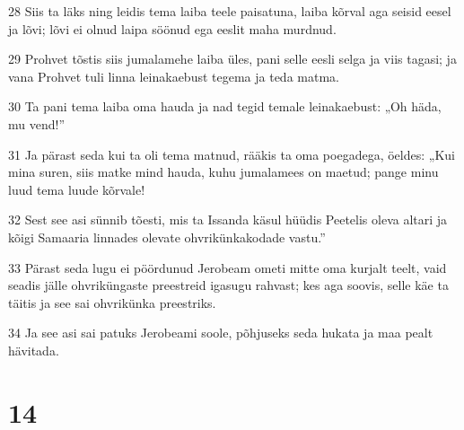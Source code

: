 \par 28 Siis ta läks ning leidis tema laiba teele paisatuna, laiba kõrval aga seisid eesel ja lõvi; lõvi ei olnud laipa söönud ega eeslit maha murdnud.
\par 29 Prohvet tõstis siis jumalamehe laiba üles, pani selle eesli selga ja viis tagasi; ja vana Prohvet tuli linna leinakaebust tegema ja teda matma.
\par 30 Ta pani tema laiba oma hauda ja nad tegid temale leinakaebust: „Oh häda, mu vend!”
\par 31 Ja pärast seda kui ta oli tema matnud, rääkis ta oma poegadega, öeldes: „Kui mina suren, siis matke mind hauda, kuhu jumalamees on maetud; pange minu luud tema luude kõrvale!
\par 32 Sest see asi sünnib tõesti, mis ta Issanda käsul hüüdis Peetelis oleva altari ja kõigi Samaaria linnades olevate ohvrikünkakodade vastu.”
\par 33 Pärast seda lugu ei pöördunud Jerobeam ometi mitte oma kurjalt teelt, vaid seadis jälle ohvriküngaste preestreid igasugu rahvast; kes aga soovis, selle käe ta täitis ja see sai ohvrikünka preestriks.
\par 34 Ja see asi sai patuks Jerobeami soole, põhjuseks seda hukata ja maa pealt hävitada.

\chapter{14}

